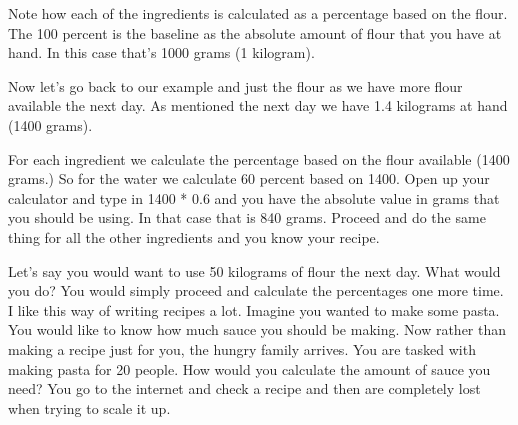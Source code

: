 Note how each of the ingredients is calculated as a percentage
based on the flour. The 100 percent is the baseline as the absolute
amount of flour that you have at hand. In this case that's 1000 grams
(1 kilogram).

Now let's go back to our example and just the flour as we have
more flour available the next day. As mentioned the next day
we have 1.4 kilograms at hand (1400 grams).

\begin{table}[H]
\centering
{}
\end{table}

For each ingredient we calculate the percentage 
based on the flour available (1400 grams.) So for the water
we calculate 60 percent based on 1400. Open up your
calculator and type in 1400 * 0.6 and you have
the absolute value in grams that you should be using.
In that case that is 840 grams. Proceed and do the same
thing for all the other ingredients and you know
your recipe. 

Let's say you would want to use 50 kilograms of flour 
the next day. What would you do? You would simply proceed
and calculate the percentages one more time. I like this
way of writing recipes a lot. Imagine you wanted to make
some pasta. You would like to know how much sauce you should
be making. Now rather than making a recipe just for you, the
hungry family arrives. You are tasked with making pasta
for 20 people. How would you calculate the amount of sauce
you need? You go to the internet and check a recipe and then
are completely lost when trying to scale it up.

